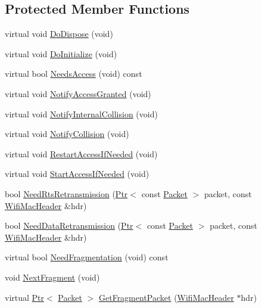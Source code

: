 \subsection*{Protected Member Functions}
\begin{DoxyCompactItemize}
\item 
virtual void \hyperlink{classns3_1_1DcaTxop_aec098be399c62ab23c509483429f96fb}{Do\+Dispose} (void)
\item 
virtual void \hyperlink{classns3_1_1DcaTxop_a397e2a4e1badd6447c3eb423a028a676}{Do\+Initialize} (void)
\item 
virtual bool \hyperlink{classns3_1_1DcaTxop_ab63b199039406a132817862cc2881928}{Needs\+Access} (void) const 
\item 
virtual void \hyperlink{classns3_1_1DcaTxop_a1760d5870d8d96153165960172ba31d5}{Notify\+Access\+Granted} (void)
\item 
virtual void \hyperlink{classns3_1_1DcaTxop_aad188df940ef1f1efe9ea0685b67a35d}{Notify\+Internal\+Collision} (void)
\item 
virtual void \hyperlink{classns3_1_1DcaTxop_a852bfd27ace4922eb7437749a4b6ea0f}{Notify\+Collision} (void)
\item 
virtual void \hyperlink{classns3_1_1DcaTxop_a65407479debe7f98691c133c6e325c19}{Restart\+Access\+If\+Needed} (void)
\item 
virtual void \hyperlink{classns3_1_1DcaTxop_a85315ad3ea316cc583603e4be29abefc}{Start\+Access\+If\+Needed} (void)
\item 
bool \hyperlink{classns3_1_1DcaTxop_a91e4d3ef666784684ecad9bd4b229333}{Need\+Rts\+Retransmission} (\hyperlink{classns3_1_1Ptr}{Ptr}$<$ const \hyperlink{classns3_1_1Packet}{Packet} $>$ packet, const \hyperlink{classns3_1_1WifiMacHeader}{Wifi\+Mac\+Header} \&hdr)
\item 
bool \hyperlink{classns3_1_1DcaTxop_abc2385deb3c362e0c2db7e7131032a0a}{Need\+Data\+Retransmission} (\hyperlink{classns3_1_1Ptr}{Ptr}$<$ const \hyperlink{classns3_1_1Packet}{Packet} $>$ packet, const \hyperlink{classns3_1_1WifiMacHeader}{Wifi\+Mac\+Header} \&hdr)
\item 
virtual bool \hyperlink{classns3_1_1DcaTxop_a43db6d7eafff8c65cf41f55026e0218d}{Need\+Fragmentation} (void) const 
\item 
void \hyperlink{classns3_1_1DcaTxop_ab440ba7f0fc04ff4d8fd3dc3fa66be11}{Next\+Fragment} (void)
\item 
virtual \hyperlink{classns3_1_1Ptr}{Ptr}$<$ \hyperlink{classns3_1_1Packet}{Packet} $>$ \hyperlink{classns3_1_1DcaTxop_ade05dd2b4ce5d127e90fb1b01bcd663f}{Get\+Fragment\+Packet} (\hyperlink{classns3_1_1WifiMacHeader}{Wifi\+Mac\+Header} $\ast$hdr)

\end{DoxyCompactItemize}
